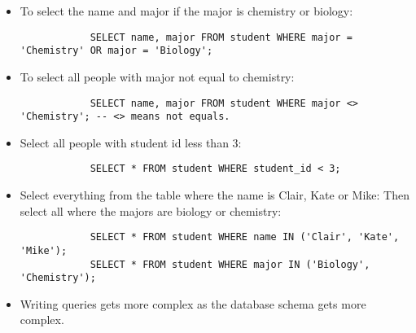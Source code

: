 \begin{itemize}
    \item To select the name and major if the major is chemistry or biology:
        \begin{verbatim}
            SELECT name, major FROM student WHERE major = 'Chemistry' OR major = 'Biology';
        \end{verbatim}
    
    \item To select all people with major not equal to chemistry:
        \begin{verbatim}
            SELECT name, major FROM student WHERE major <> 'Chemistry'; -- <> means not equals.
        \end{verbatim}
    
    \item Select all people with student id less than 3:
        \begin{verbatim}
            SELECT * FROM student WHERE student_id < 3;
        \end{verbatim}
    
    \item Select everything from the table where the name is Clair, Kate or Mike: Then select all where the majors are biology or chemistry:
        \begin{verbatim}
            SELECT * FROM student WHERE name IN ('Clair', 'Kate', 'Mike');
            SELECT * FROM student WHERE major IN ('Biology', 'Chemistry');
        \end{verbatim}
    
    \item Writing queries gets more complex as the database schema gets more complex.
\end{itemize}
